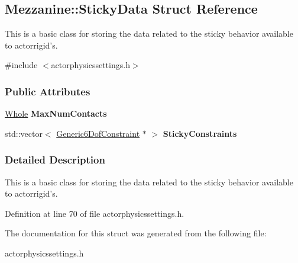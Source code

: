 \hypertarget{structMezzanine_1_1StickyData}{
\subsection{Mezzanine::StickyData Struct Reference}
\label{structMezzanine_1_1StickyData}
}


This is a basic class for storing the data related to the sticky behavior available to actorrigid's.  




{\ttfamily \#include $<$actorphysicssettings.h$>$}

\subsubsection*{Public Attributes}
\begin{DoxyCompactItemize}
\item 
\hypertarget{structMezzanine_1_1StickyData_a187bcd953ed41f4af50562255f633ba5}{
\hyperlink{namespaceMezzanine_adcbb6ce6d1eb4379d109e51171e2e493}{Whole} {\bfseries MaxNumContacts}}
\label{structMezzanine_1_1StickyData_a187bcd953ed41f4af50562255f633ba5}

\item 
\hypertarget{structMezzanine_1_1StickyData_a3dc19079a5f316c5ceba3a1e7fc673f2}{
std::vector$<$ \hyperlink{classMezzanine_1_1Generic6DofConstraint}{Generic6DofConstraint} $\ast$ $>$ {\bfseries StickyConstraints}}
\label{structMezzanine_1_1StickyData_a3dc19079a5f316c5ceba3a1e7fc673f2}

\end{DoxyCompactItemize}


\subsubsection{Detailed Description}
This is a basic class for storing the data related to the sticky behavior available to actorrigid's. 

Definition at line 70 of file actorphysicssettings.h.



The documentation for this struct was generated from the following file:\begin{DoxyCompactItemize}
\item 
actorphysicssettings.h\end{DoxyCompactItemize}
